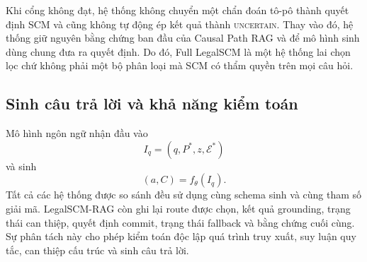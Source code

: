 Khi cổng không đạt, hệ thống không chuyển một chẩn đoán tô-pô thành quyết định
SCM và cũng không tự động ép kết quả thành \textsc{uncertain}. Thay vào đó, hệ
thống giữ nguyên bằng chứng ban đầu của Causal Path RAG và để mô hình sinh dùng
chung đưa ra quyết định. Do đó, Full LegalSCM là một hệ thống lai chọn lọc chứ
không phải một bộ phân loại mà SCM có thẩm quyền trên mọi câu hỏi.

\subsection{Sinh câu trả lời và khả năng kiểm toán}

Mô hình ngôn ngữ nhận đầu vào
\begin{equation}
I_q=(q,P^*,z,\mathcal{E}^*)
\end{equation}
và sinh
\begin{equation}
(a,C)=f_{\theta}(I_q).
\end{equation}
Tất cả các hệ thống được so sánh đều sử dụng cùng schema sinh và cùng tham số
giải mã. LegalSCM-RAG còn ghi lại route được chọn, kết quả grounding, trạng
thái can thiệp, quyết định commit, trạng thái fallback và bằng chứng cuối cùng.
Sự phân tách này cho phép kiểm toán độc lập quá trình truy xuất, suy luận quy
tắc, can thiệp cấu trúc và sinh câu trả lời.
